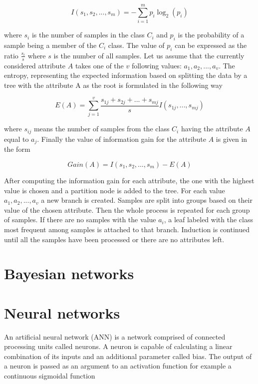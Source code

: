 \documentclass[11pt,oneside, a4paper]{report}
\begin{document}
\begin{equation} \label{eq:information-gain}
I(s_1, s_2, ..., s_m) = - \sum_{i=1}^{m} p_i \log_{2}(p_i)
\end{equation}

where $s_i$ is the number of samples in the class $C_i$ and $p_i$ is the probability of a sample being a member of the $C_i$ class. The value of $p_i$ can be expressed as the ratio $\frac{s_i}{s}$ where $s$ is the number of all samples.
Let us assume that the currently considered attribute $A$ takes one of the $v$ following values: ${a_1, a_2, ..., a_v}$. The entropy, representing the expected information based on splitting the data by a tree with the attribute A as the root is formulated in the following way

\begin{equation} \label{eq:entropy}
E(A) = \sum_{j=1}^{v} \frac{s_{1j} + s_{2j} + ... + s_{mj}}{s} I(s_{1j}, ..., s_{mj})
\end{equation}

where $s_{ij}$ means the number of samples from the class $C_i$ having the attribute $A$ equal to $a_j$.
Finally the value of information gain for the attribute $A$ is given in the form

\begin{equation} \label{eq:information-gain}
Gain(A) = I(s_1, s_2, ... , s_m) - E(A)
\end{equation}

After computing the information gain for each attribute, the one with the highest value is chosen and a partition node is added to the tree. For each value ${a_1, a_2, ..., a_v}$ a new branch is created. Samples are split into groups based on their value of the chosen attribute. Then the whole process is repeated for each group of samples. If there are no samples with the value $a_i$, a leaf labeled with the class most frequent among samples is attached to that branch. Induction is continued until all the samples have been processed or there are no attributes left.

\section{Bayesian networks}
\section{Neural networks}
An artificial neural network (ANN) is a network comprised of connected processing units called neurons. A neuron is capable of calculating a linear combination of its inputs and an additional parameter called bias. The output of a neuron is passed as an argument to an activation function for example a continuous sigmoidal function
\end{document}
